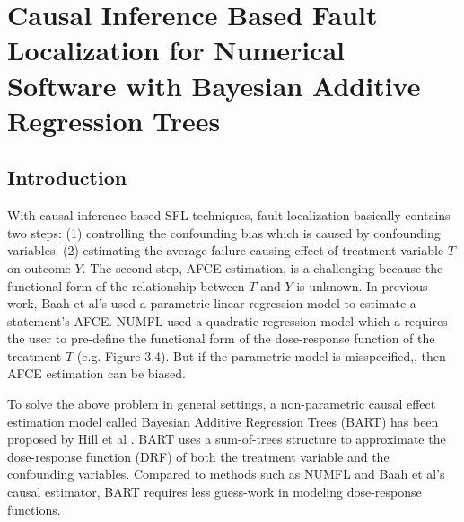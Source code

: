 \chapter{Causal Inference Based Fault Localization for Numerical Software with Bayesian Additive Regression Trees}\label{chap:BART}


\section{Introduction}\label{BARTintro}
\vspace{-2pt}
With causal inference based SFL techniques\cite{bai2015numfl, baah2010causal, baah2011mitigating,shu2013mfl}, fault localization basically contains two steps: (1) controlling the confounding bias which is caused by confounding variables. (2) estimating the average failure causing effect of treatment variable $T$ on outcome $Y$. The second step, AFCE estimation, is a challenging because the functional form of the relationship between $T$ and $Y$ is unknown. In previous work, Baah et al’s used a parametric linear regression model to estimate a statement's AFCE. NUMFL used a quadratic regression model which a requires the user to pre-define the functional form of the dose-response function of the treatment $T$ (e.g. Figure 3.4). But if the parametric model is misspecified,, then AFCE estimation can be biased.

To solve the above problem in general settings, a non-parametric causal effect estimation model called Bayesian Additive Regression Trees (BART) has been proposed by Hill et al \cite{hill2012bayesian}. BART uses a sum-of-trees structure to approximate the dose-response function (DRF) of both the treatment variable and the confounding variables. 
Compared to methods such as NUMFL and Baah et al’s causal estimator, BART requires less guess-work in modeling dose-response functions.   

